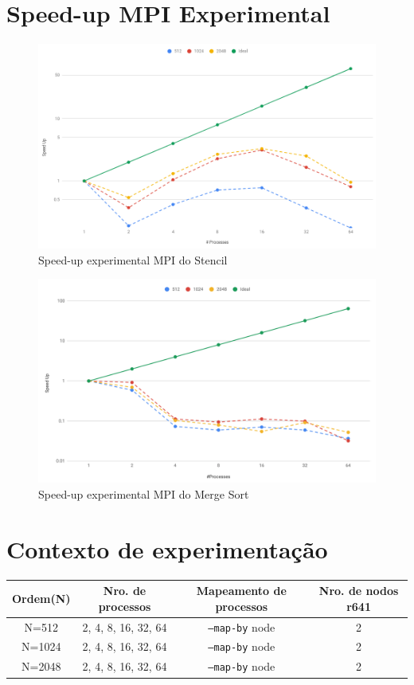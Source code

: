 \documentclass{article}
\begin{document}
\begin{appendix}
\section{Speed-up MPI Experimental}
\begin{figure}[H]
    \centering
    \includegraphics[width=16cm]{Pictures/ExperimentalGraph1.png}
    \caption{Speed-up experimental MPI do Stencil}
    \label{graphStencil}
\end{figure}

\begin{figure}[H]
    \centering
    \includegraphics[width=16cm]{Pictures/ExperimentalGraph2.png}
    \caption{Speed-up experimental MPI do Merge Sort}
        \label{graphMergeSort}
\end{figure}

\section{Contexto de experimentação}

\label{lab_config}
\begin{tabular}{|c|c|c|c|}
\hline
\textbf{Ordem(N)} & \textbf{Nro. de processos} & \textbf{Mapeamento de processos} & \textbf{Nro. de nodos} r641 \\
\hline
N=512           & 2, 4, 8, 16, 32, 64  & \texttt{--map-by} node & 2 \\
\hline
N=1024          & 2, 4, 8, 16, 32, 64  & \texttt{--map-by} node & 2 \\
\hline
N=2048          & 2, 4, 8, 16, 32, 64  & \texttt{--map-by} node & 2 \\
\hline
\end{tabular}
\end{appendix}
\end{document}
